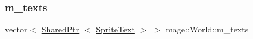 \hypertarget{classmage_1_1_world_a38e19c4c5caf02633f406ecfd04a2e4d}{}\label{classmage_1_1_world_a38e19c4c5caf02633f406ecfd04a2e4d} 
\subsubsection{\texorpdfstring{m\+\_\+texts}{m\_texts}}
{\footnotesize\ttfamily vector$<$ \hyperlink{namespacemage_a1e01ae66713838a7a67d30e44c67703e}{Shared\+Ptr} $<$ \hyperlink{classmage_1_1_sprite_text}{Sprite\+Text} $>$ $>$ mage\+::\+World\+::m\+\_\+texts\hspace{0.3cm}{\ttfamily [private]}}

